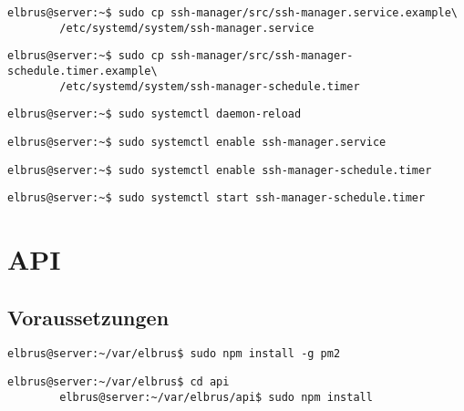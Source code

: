 \documentclass{article}
\begin{document}
	\lstset{style=commands}
	\begin{lstlisting}[caption={Kopieren des Serviceprogrammes.}]
		elbrus@server:~$ sudo cp ssh-manager/src/ssh-manager.service.example\
		/etc/systemd/system/ssh-manager.service
	\end{lstlisting}

	\begin{lstlisting}[caption={Kopieren des Zeitplanungsprogrammes.}]
		elbrus@server:~$ sudo cp ssh-manager/src/ssh-manager-schedule.timer.example\
		/etc/systemd/system/ssh-manager-schedule.timer
	\end{lstlisting}

	\begin{lstlisting}[caption={Neuladen des 'systemctl' Deamons.}]
		elbrus@server:~$ sudo systemctl daemon-reload
	\end{lstlisting}

	\begin{lstlisting}[caption={Aktivieren des Serviceprogrammes.}]
		elbrus@server:~$ sudo systemctl enable ssh-manager.service
	\end{lstlisting}

	\begin{lstlisting}[caption={Aktivieren des Zeitplanungsprogrammes.}]
		elbrus@server:~$ sudo systemctl enable ssh-manager-schedule.timer
	\end{lstlisting}

	\begin{lstlisting}[caption={Starten des Zeitplanungsprogrammes.}]
		elbrus@server:~$ sudo systemctl start ssh-manager-schedule.timer
	\end{lstlisting}
	\newpage
	
	\section{API}
	\lstset{style=commands}

	\subsection{Voraussetzungen}
	\begin{lstlisting}[caption={Installieren von 'pm2'.}]
		elbrus@server:~/var/elbrus$ sudo npm install -g pm2
	\end{lstlisting}

	\begin{lstlisting}[caption={Nachinstallieren der Abhängigkeiten.}]
		elbrus@server:~/var/elbrus$ cd api
		elbrus@server:~/var/elbrus/api$ sudo npm install
	\end{lstlisting}
	\newpage
\end{document}
